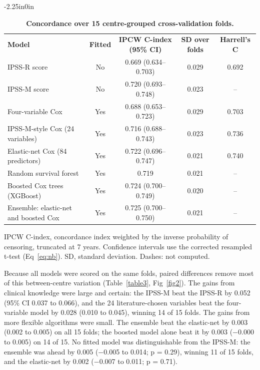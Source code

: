 \documentclass[10pt,letterpaper]{article}
\newlength\savedwidth
\newcommand\thickhline{\noalign{\global\savedwidth\arrayrulewidth\global\arrayrulewidth 2pt}%
\hline
\noalign{\global\arrayrulewidth\savedwidth}}
\begin{document}
\begin{table}[H]
\begin{adjustwidth}{-2.25in}{0in}
\centering
\caption{{\bf Concordance over 15 centre-grouped cross-validation folds.}}
\begin{tabular}{|l|c|c|c|c|}
\hline
{\bf Model} & {\bf Fitted} & {\bf IPCW C-index (95\% CI)} & {\bf SD over folds} & {\bf Harrell's C}\\ \thickhline
IPSS-R score & No & 0.669 (0.634--0.703) & 0.029 & 0.692 \\ \hline
IPSS-M score & No & 0.720 (0.693--0.748) & 0.023 & -- \\ \hline
Four-variable Cox & Yes & 0.688 (0.653--0.723) & 0.029 & 0.703 \\ \hline
IPSS-M-style Cox (24 variables) & Yes & 0.716 (0.688--0.743) & 0.023 & 0.736 \\ \hline
Elastic-net Cox (84 predictors) & Yes & 0.722 (0.696--0.747) & 0.021 & 0.740 \\ \hline
Random survival forest & Yes & 0.719 & 0.021 & -- \\ \hline
Boosted Cox trees (XGBoost) & Yes & 0.724 (0.700--0.749) & 0.020 & -- \\ \hline
Ensemble: elastic-net and boosted Cox & Yes & 0.725 (0.700--0.750) & 0.021 & -- \\ \hline
\end{tabular}
\begin{flushleft} IPCW C-index, concordance index weighted by the inverse probability of
censoring, truncated at 7 years. Confidence intervals use the corrected resampled t-test
(Eq~\ref{eq:nb}). SD, standard deviation. Dashes: not computed.
\end{flushleft}
\label{table2}
\end{adjustwidth}
\end{table}

Because all models were scored on the same folds, paired differences remove most of this
between-centre variation (Table~\ref{table3}, Fig~\ref{fig2}). The gains from clinical
knowledge were large and certain: the IPSS-M beat the IPSS-R by 0.052 (95\% CI 0.037 to
0.066), and the 24 literature-chosen variables beat the four-variable model by 0.028 (0.010
to 0.045), winning 14 of 15 folds. The gains from more flexible algorithms were small. The
ensemble beat the elastic-net by 0.003 (0.002 to 0.005) on all 15 folds; the boosted model
alone beat it by 0.003 ($-$0.000 to 0.005) on 14 of 15. No fitted model was distinguishable
from the IPSS-M: the ensemble was ahead by 0.005 ($-$0.005 to 0.014; p = 0.29), winning 11
of 15 folds, and the elastic-net by 0.002 ($-$0.007 to 0.011; p = 0.71).
\end{document}
